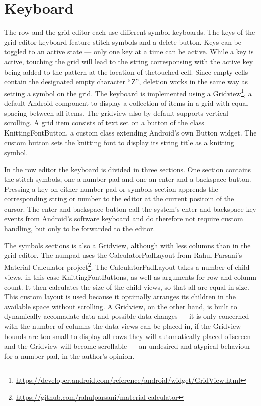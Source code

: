 \section{Keyboard}
The row and the grid editor each use different symbol keyboards. The keys of the grid editor keyboard feature stitch symbols and a delete button. Keys can be toggled to an active state --- only one key at a time can be active. While a key is active, touching the grid will lead to the string corresponsing with the active key being added to the pattern at the location of thetouched cell. Since empty cells contain the designated empty character ``Z'', deletion works in the same way as setting a symbol on the grid. The keyboard is implemented using a Gridview\footnote{\url{https://developer.android.com/reference/android/widget/GridView.html}}, a default Android component to display a collection of items in a grid with equal spacing between all items. The gridview also by default supports vertical scrolling. A grid item consists of text set on a button of the class KnittingFontButton, a custom class extending Android’s own Button widget. The custom button sets the knitting font to display its string title as a knitting symbol. 

In the row editor the keyboard is divided in three sections. One section contains the stitch symbols, one a number pad and one an enter and a backspace button. Pressing a key on either number pad or symbols section apprends the corresponding string or number to the editor at the current positoin of the cursor. The enter and backspace button call the system’s enter and backspace key events from Android’s software keyboard and do therefore not require custom handling, but only to be forwarded to the editor.

The symbols sections is also a Gridview, although with less columns than in the grid editor. The numpad uses the CalculatorPadLayout from Rahul Parsani's Material Calculator project\footnote{\url{https://github.com/rahulparsani/material-calculator}}. The CalculatorPadLayout takes a number of child views, in this case KnittingFontButtons, as well as arguments for row and column count. It then calculates the size of the child views, so that all are equal in size. This custom layout is used because it optimally arranges its children in the available space without scrolling. A Gridview, on the other hand, is built to dynamically accomadate data and possible data changes --- it is only concerned with the number of columns the data views can be placed in, if the Gridview bounds are too small to display all rows they will automatically placed offscreen and the Gridview will become scrollable --- an undesired and atypical behaviour for a number pad, in the author's opinion.

